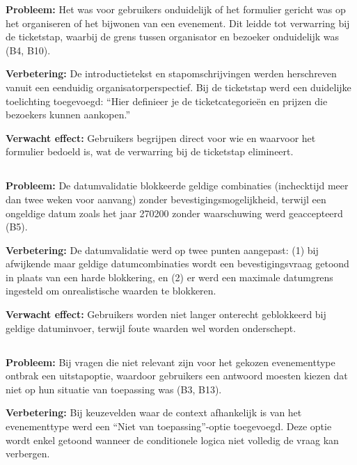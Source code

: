 \textbf{Probleem:} Het was voor gebruikers onduidelijk of het formulier gericht was op het organiseren of het bijwonen van een evenement. Dit leidde tot verwarring bij de ticketstap, waarbij de grens tussen organisator en bezoeker onduidelijk was (B4, B10).

\textbf{Verbetering:} De introductietekst en stapomschrijvingen werden herschreven vanuit een eenduidig organisatorperspectief. Bij de ticketstap werd een duidelijke toelichting toegevoegd: ``Hier definieer je de ticketcategorieën en prijzen die bezoekers kunnen aankopen.''

\textbf{Verwacht effect:} Gebruikers begrijpen direct voor wie en waarvoor het formulier bedoeld is, wat de verwarring bij de ticketstap elimineert.

\subsection{}

\textbf{Probleem:} De datumvalidatie blokkeerde geldige combinaties (inchecktijd meer dan twee weken voor aanvang) zonder bevestigingsmogelijkheid, terwijl een ongeldige datum zoals het jaar 270200 zonder waarschuwing werd geaccepteerd (B5).

\textbf{Verbetering:} De datumvalidatie werd op twee punten aangepast: (1) bij afwijkende maar geldige datumcombinaties wordt een bevestigingsvraag getoond in plaats van een harde blokkering, en (2) er werd een maximale datumgrens ingesteld om onrealistische waarden te blokkeren.

\textbf{Verwacht effect:} Gebruikers worden niet langer onterecht geblokkeerd bij geldige datuminvoer, terwijl foute waarden wel worden onderschept.

\subsection{}

\textbf{Probleem:} Bij vragen die niet relevant zijn voor het gekozen evenementtype ontbrak een uitstapoptie, waardoor gebruikers een antwoord moesten kiezen dat niet op hun situatie van toepassing was (B3, B13).

\textbf{Verbetering:} Bij keuzevelden waar de context afhankelijk is van het evenementtype werd een ``Niet van toepassing''-optie toegevoegd. Deze optie wordt enkel getoond wanneer de conditionele logica niet volledig de vraag kan verbergen.

